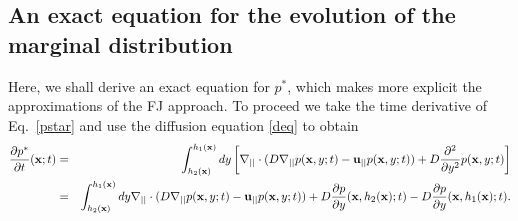 \documentclass[pre,showpacs,preprintnumbers,amsmath,amssymb,superscriptaddress]{revtex4-1}
\begin{document}
\subsection{An exact equation for the evolution of the marginal distribution}





 Here, we shall derive an exact equation for $p^*$, which makes more explicit the approximations of the FJ approach. To proceed we take the time derivative of Eq.~\eqref{pstar} and use the diffusion equation
\eqref{deq} to obtain 
\begin{eqnarray}
\frac{\partial p^*}{\partial t}({\bf x};t) &=& \int_{h_2({\bf x})}^{h_1({\bf x})} dy \left[\nabla_{||}\cdot (D\nabla_{||} p({\bf x},y;t) -{\bf u}_{||} p({\bf x},y;t))
+ D\frac{\partial^2}{\partial y^2}p({\bf x},y;t) \right]\nonumber \\
&=& \int_{h_2({\bf x})}^{h_1({\bf x})} dy \nabla_{||}\cdot (D\nabla_{||} p({\bf x},y;t) -{\bf u}_{||} p({\bf x},y;t)) + D\frac{\partial p}{\partial y}({\bf x},h_2({\bf x});t) - D \frac{\partial p}{\partial y}({\bf x},h_1({\bf x});t) . 
\end{eqnarray}

\end{document}
